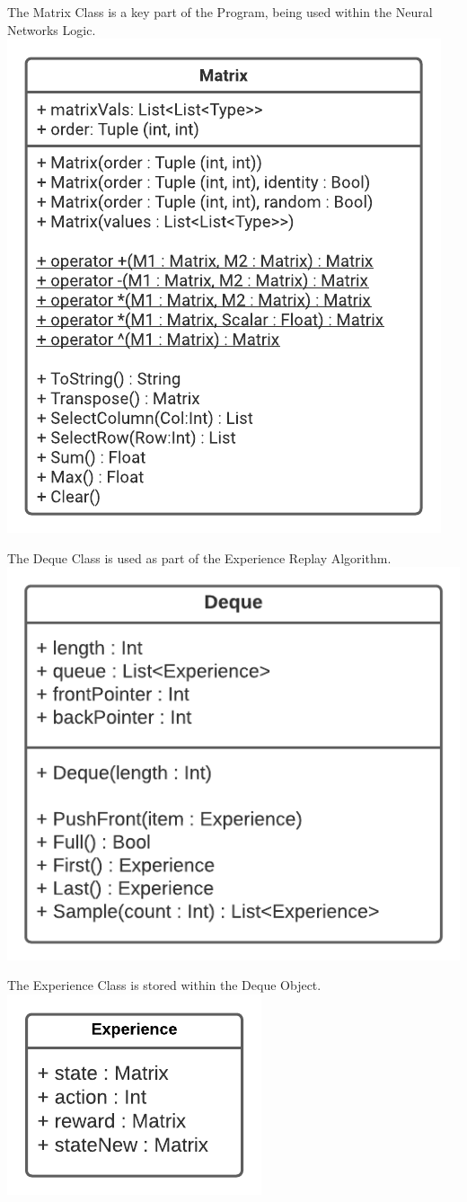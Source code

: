 \begin{flushleft}
\begin{center}
                The Matrix Class is a key part of the Program, being used within the Neural Networks Logic. \\
                \includegraphics[width=.55\textwidth]{Images/Design/Classes/Matrix.png} \\
                \vspace{0.2cm}

                The Deque Class is used as part of the Experience Replay Algorithm. \\
                \includegraphics[width=.50\textwidth]{Images/Design/Classes/Deque.png} \\
                \vspace{0.2cm}

                The Experience Class is stored within the Deque Object. \\
                \includegraphics[width=.30\textwidth]{Images/Design/Classes/Experience.png} \\
                \vspace{0.2cm}


\end{center}
\end{flushleft}
